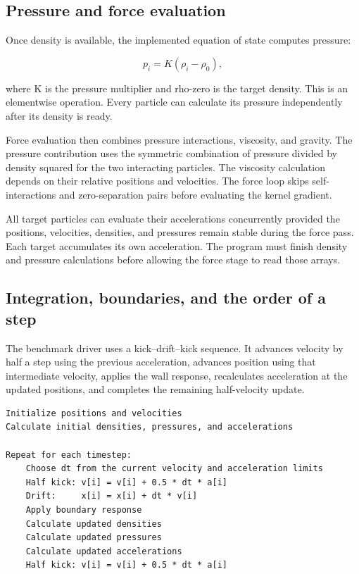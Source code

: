\documentclass[
  11pt,
]{article}
\begin{document}
\subsection{Pressure and force
evaluation}\label{pressure-and-force-evaluation}

Once density is available, the implemented equation of state computes
pressure:

\[
p_i = K(\rho_i-\rho_0),
\]

where K is the pressure multiplier and rho-zero is the target density.
This is an elementwise operation. Every particle can calculate its
pressure independently after its density is ready.

Force evaluation then combines pressure interactions, viscosity, and
gravity. The pressure contribution uses the symmetric combination of
pressure divided by density squared for the two interacting particles.
The viscosity calculation depends on their relative positions and
velocities. The force loop skips self-interactions and zero-separation
pairs before evaluating the kernel gradient.

All target particles can evaluate their accelerations concurrently
provided the positions, velocities, densities, and pressures remain
stable during the force pass. Each target accumulates its own
acceleration. The program must finish density and pressure calculations
before allowing the force stage to read those arrays.

\subsection{Integration, boundaries, and the order of a
step}\label{integration-boundaries-and-the-order-of-a-step}

The benchmark driver uses a kick--drift--kick sequence. It advances
velocity by half a step using the previous acceleration, advances
position using that intermediate velocity, applies the wall response,
recalculates acceleration at the updated positions, and completes the
remaining half-velocity update.

\begin{verbatim}
Initialize positions and velocities
Calculate initial densities, pressures, and accelerations

Repeat for each timestep:
    Choose dt from the current velocity and acceleration limits
    Half kick: v[i] = v[i] + 0.5 * dt * a[i]
    Drift:     x[i] = x[i] + dt * v[i]
    Apply boundary response
    Calculate updated densities
    Calculate updated pressures
    Calculate updated accelerations
    Half kick: v[i] = v[i] + 0.5 * dt * a[i]
\end{verbatim}
\end{document}
